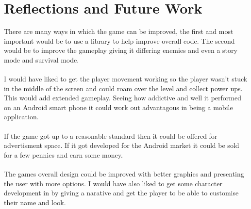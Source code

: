 \documentclass{article}
\begin{document}
\newpage
\section{Reflections and Future Work}
There are many ways in which the game can be improved, the first and most important would be to use a library to help improve overall code. The second would be to improve the gameplay giving it differing enemies and even a story mode and survival mode.
\\\\
I would have liked to get the player movement working so the player wasn't stuck in the middle of the screen and could roam over the level and collect power ups. This would add extended gameplay. Seeing how addictive and well it performed on an Android smart phone it could work out advantagous in being a mobile application.
\\\\
If the game got up to a reasonable standard then it could be offered for advertisment space. If it got developed for the Android market it could be sold for a few pennies and earn some money.
\\\\
The games overall design could be improved with better graphics and presenting the user with more options. I would have also liked to get some character development in by giving a narative and get the player to be able to customise their name and look.
\end{document}
